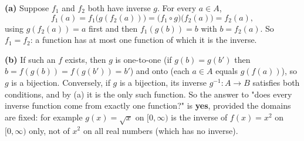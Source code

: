 \textbf{(a)} Suppose $f_1$ and $f_2$ both have inverse $g$. For every $a\in A$,
\[
f_1(a)=f_1\bigl(g(f_2(a))\bigr)=\bigl(f_1\circ g\bigr)\bigl(f_2(a)\bigr)=f_2(a),
\]
using $g(f_2(a))=a$ first and then $f_1(g(b))=b$ with $b=f_2(a)$. So $f_1=f_2$: a function has at most one function of which it is the inverse.

\textbf{(b)} If such an $f$ exists, then $g$ is one-to-one (if $g(b)=g(b')$ then $b=f(g(b))=f(g(b'))=b'$) and onto (each $a\in A$ equals $g(f(a))$), so $g$ is a bijection. Conversely, if $g$ is a bijection, its inverse $g^{-1}:A\to B$ satisfies both conditions, and by (a) it is the only such function. So the answer to "does every inverse function come from exactly one function?" is \textbf{yes}, provided the domains are fixed: for example $g(x)=\sqrt{x}$ on $[0,\infty)$ is the inverse of $f(x)=x^2$ on $[0,\infty)$ only, not of $x^2$ on all real numbers (which has no inverse).
